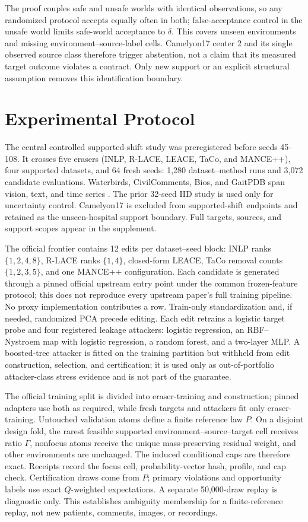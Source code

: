 The proof couples safe and unsafe worlds with identical observations, so any
randomized protocol accepts equally often in both; false-acceptance control in
the unsafe world limits safe-world acceptance to $\delta$. This covers unseen
environments and missing environment--source-label cells. Camelyon17 center 2
and its single observed source class therefore trigger abstention, not a claim
that its measured target outcome violates a contract. Only new support or an
explicit structural assumption removes this identification boundary.

\section{Experimental Protocol}

The central controlled supported-shift study was preregistered before seeds
45--108. It crosses five erasers (INLP, R-LACE, LEACE, TaCo, and MANCE++), four
supported datasets, and 64 fresh seeds: 1,280 dataset--method runs and 3,072
candidate evaluations. Waterbirds, CivilComments, Bios, and GaitPDB span
vision, text, and time series \cite{sagawa2020groupdro,koh2021wilds,
borkan2019civilcomments,dearteaga2019bios}. The prior 32-seed IID study is used
only for uncertainty control. Camelyon17 is excluded from supported-shift
endpoints and retained as the unseen-hospital support boundary. Full targets,
sources, and support scopes appear in the supplement.

The official frontier contains 12 edits per dataset--seed block: INLP ranks
$\{1,2,4,8\}$, R-LACE ranks $\{1,4\}$, closed-form LEACE, TaCo removal counts
$\{1,2,3,5\}$, and one MANCE++ configuration. Each candidate is generated
through a pinned official upstream entry point under the common frozen-feature
protocol; this does not reproduce every upstream paper's full training pipeline.
No proxy implementation contributes a row. Train-only standardization and, if
needed, randomized PCA precede editing. Each edit retrains a logistic target
probe and four registered leakage attackers: logistic regression, an
RBF--Nystroem map with logistic regression, a random forest, and a two-layer
MLP. A boosted-tree attacker is fitted on the training partition but withheld
from edit construction, selection, and certification; it is used only as
out-of-portfolio attacker-class stress evidence and is not part of the guarantee.

The official training split is divided into eraser-training and construction;
pinned adapters use both as required, while fresh targets and attackers fit
only eraser-training. Untouched validation atoms define a finite reference law
$P$. On a disjoint design fold, the rarest feasible supported
environment--source--target cell receives ratio $\Gamma$, nonfocus atoms receive
the unique mass-preserving residual weight, and other environments are
unchanged. The induced conditional caps are therefore exact. Receipts record
the focus cell, probability-vector hash, profile, and cap check. Certification
draws come from $P$; primary violations and opportunity labels use exact
$Q$-weighted expectations. A separate 50,000-draw replay is diagnostic only.
This establishes ambiguity membership for a finite-reference replay, not new
patients, comments, images, or recordings.

